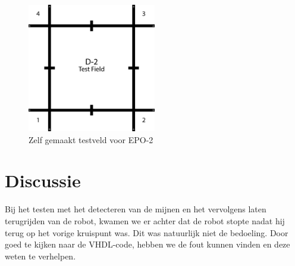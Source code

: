 \documentclass{report}
\begin{document}
\begin{figure}[H]
	\centering
	\includegraphics[width=0.5\textwidth]{d-2_test_field.png}
	\caption{Zelf gemaakt testveld voor EPO-2}
	\label{fig:testfield}
\end{figure}

\section{Discussie}


Bij het testen met het detecteren van de mijnen en het vervolgens laten terugrijden van de robot, kwamen we er achter dat de robot stopte nadat hij terug op het vorige kruispunt was. Dit was natuurlijk niet de bedoeling.
Door goed te kijken naar de VHDL-code, hebben we de fout kunnen vinden en deze weten te verhelpen.

\end{document}

